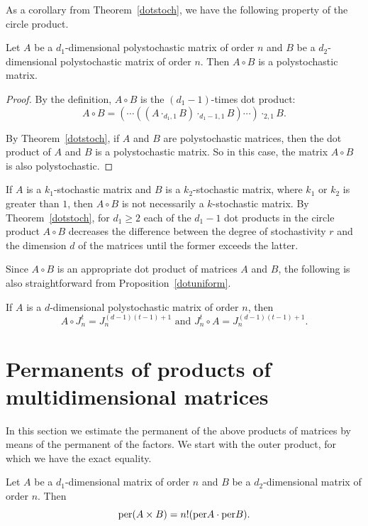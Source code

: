 \documentclass[a4paper]{article}
\begin{document}
As a corollary from Theorem~\ref{dotstoch}, we have the following property of  the circle product.


\begin{teorema}
Let $A$ be a $d_1$-dimensional polystochastic  matrix of order $n$ and $B$  be a $d_2$-dimensional polystochastic matrix of order $n$. Then $A \circ B$ is a polystochastic matrix. 
\end{teorema}  

\begin{proof}
 By the definition, $A \circ B$ is the $(d_1 -1)$-times dot product:
  $$A \circ B = (\cdots((A \cdot_{d_1, 1}B) \cdot_{d_1 - 1, 1}B) \cdots) \cdot_{2, 1}B.$$
 
 By Theorem~\ref{dotstoch}, if $A$ and $B$ are polystochastic matrices, then the dot product of $A$ and $B$ is a polystochastic matrix. So in this case, the matrix $A \circ B$ is also polystochastic. 
\end{proof}


If $A$ is a $k_1$-stochastic matrix and $B$ is a $k_2$-stochastic matrix, where $k_1$ or $k_2$ is greater than $1$, then  $A \circ B$ is not necessarily a $k$-stochastic matrix. By Theorem~\ref{dotstoch},  for $d_1 \geq 2$ each of the $d_1 - 1$ dot products in the circle product  $A \circ B$ decreases the difference between the degree of stochastivity $r$ and the dimension $d$ of the matrices until the former exceeds the latter. 

Since $A \circ B$ is an appropriate dot product of matrices $A$ and $B$, the following is also straightforward from Proposition~\ref{dotuniform}.


\begin{utv} 
If $A$ is a $d$-dimensional polystochastic matrix of order $n$, then
$$A \circ  J^t_n = J^{(d-1)(t-1)+1}_n  \mbox{ and } J^t_n \circ  A = J^{(d-1)(t-1)+1}_n.$$ 
\end{utv}



\section{Permanents  of products of multidimensional matrices} \label{perprodsec}

In this section we estimate the permanent of the above products of matrices by means of the permanent of the factors. We start with the outer product, for which we have the exact equality. 


\begin{teorema} \label{directprodper}
Let  $A$ be a $d_1$-dimensional matrix of order $n$ and $B$ be a $d_2$-dimensional matrix of order $n$. Then 
$${\rm per} (A \times B) = n!( {\rm per} A \cdot {\rm per} B).$$
\end{teorema}
\end{document}

